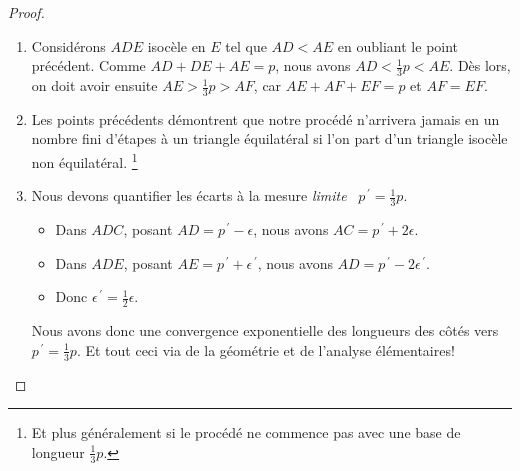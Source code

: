 \begin{proof}
\begin{enumerate}
		\item Considérons $ADE$ isocèle en $E$ tel que $AD < AE$ en oubliant le point précédent.
		Comme $AD + DE + AE = p$, nous avons $AD < \frac13p < AE$.
		Dès lors, on doit avoir ensuite  $AE > \frac13p > AF$, car $AE + AF + EF = p$ et $AF = EF$.


		\item Les points précédents démontrent que notre procédé n'arrivera jamais en un nombre fini d'étapes à un triangle équilatéral si l'on part d'un triangle isocèle non équilatéral.%
		\footnote{
			Et plus généralement si le procédé ne commence pas avec une base de longueur $\frac13 p$.
		}


		\item Nous devons quantifier les écarts à la mesure \og \emph{limite} \fg\ $p^{\,\prime} = \frac13 p$. 
		\begin{itemize}
			\item Dans $ADC$, posant $AD = p^{\,\prime} - \epsilon$, nous avons $AC = p^{\,\prime} + 2 \epsilon$.

			\item Dans $ADE$, posant $AE = p^{\,\prime} + \epsilon^{\,\prime}$, nous avons $AD = p^{\,\prime} - 2 \epsilon^{\,\prime}$.

			\item Donc $\epsilon^{\,\prime} = \frac12 \epsilon$.
		\end{itemize}
		
		\noindent
		Nous avons donc une convergence exponentielle des longueurs des côtés vers $p^{\,\prime} = \frac13 p$. Et tout ceci via de la géométrie et de l'analyse élémentaires!
	\end{enumerate}
\end{proof}




